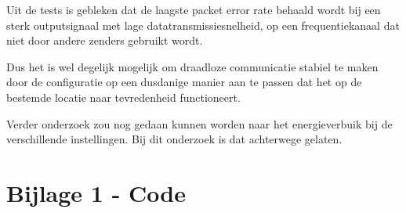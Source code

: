 \documentclass[a4paper,10pt]{article}
\begin{document}
Uit de tests is gebleken dat de laagste packet error rate behaald wordt bij een sterk outputsignaal met lage datatransmissiesnelheid, op een frequentiekanaal dat niet door andere zenders gebruikt wordt.

Dus het is wel degelijk mogelijk om draadloze communicatie stabiel te maken door de configuratie op een dusdanige manier aan te passen dat het op de bestemde locatie naar tevredenheid functioneert.

Verder onderzoek zou nog gedaan kunnen worden naar het energieverbuik bij de verschillende instellingen. Bij dit onderzoek is dat achterwege gelaten.

\newpage
\appendix
\section{Bijlage 1 - Code}
\label{sec:code}

\end{document}
